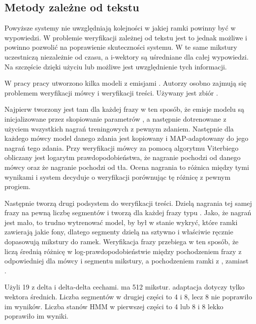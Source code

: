 
\subsection{Metody zależne od tekstu}

Powyższe systemy nie uwzględniają kolejności w jakiej ramki powinny być w wypowiedzi. W problemie weryfikacji
zależnej od tekstu jest to jednak możliwe i powinno pozwolić na poprawienie skuteczności systemu.
W  te same mikstury uczestniczą niezależnie od czasu, a i-wektory są uśredniane dla całej
wypowiedzi. Na szczęście dzięki użyciu  lub  możliwe jest uwzględnienie tych
informacji\cite{parallelSpeakerAnd}.

W pracy \cite{parallelSpeakerAnd}
pracy utworzono kilka modeli  z emisjami . Autorzy osobno
zajmują się problemem weryfikacji mówcy i weryfikacji treści. Używany jest zbiór .

Najpierw tworzony jest tam  dla każdej frazy w ten sposób, że emisje modelu są inicjalizowane przez
skopiowanie parametrów ,
a następnie dotrenowane z użyciem wszystkich nagrań treningowych z pewnym zdaniem.
Następnie dla każdego mówcy model danego zdania jest kopiowany i MAP-adaptowany do jego nagrań tego zdania.
Przy weryfikacji mówcy za pomocą algorytmu Viterbiego obliczany jest logarytm
prawdopodobieństwa, że nagranie pochodzi od danego mówcy oraz że nagranie pochodzi od  tła.
Ocena nagrania to różnica między tymi wynikami i system decyduje o weryfikacji porównując tę różnicę z pewnym progiem.

Następnie tworzą drugi podsystem do weryfikacji treści. Dzielą nagrania tej samej frazy na pewną liczbę segmentów
i tworzą dla każdej frazy  typu . Jako, że nagrań jest mało, to trudno
wytrenować model, by był w stanie wykryć, które ramki zawierają jakie fony, dlatego segmenty dzielą na sztywno
i właściwie ręcznie dopasowują mikstury do ramek. Weryfikacja frazy przebiega w ten sposób, że liczą średnią
różnicę w log-prawdopodobieństwie między pochodzeniem frazy z odpowiedniej dla mówcy i segmentu mikstury, a
pochodzeniem ramki z , zamiast .

Użyli 19  z delta i delta-delta cechami.  ma 512 mikstur.  adaptacja
dotyczy tylko wektora średnich. Liczba segmentów w drugiej części to 4 i 8, lecz 8 nie poprawiło im wyników. Liczba
stanów HMM w pierwszej części to 4 lub 8 i 8 lekko poprawiło im wyniki.

